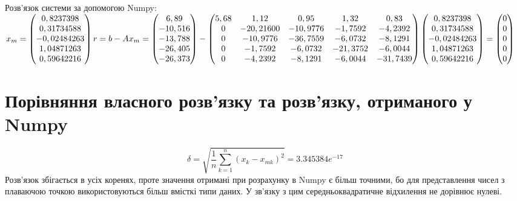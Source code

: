 \documentclass{report}
\begin{document}
Розв'язок системи за допомогою Numpy: $x_m = \begin{pmatrix}0,8237398\\0,31734588\\-0,02484263\\1,04871263\\0,59642216\end{pmatrix}\\
r = b - Ax_m =
\begin{pmatrix}
6,89\\
-10,516\\
-13,788\\
-26,405\\
-26,373
\end{pmatrix} - \begin{pmatrix}
5,68 & 1,12 & 0,95 & 1,32 & 0,83\\
0 & -20,21600 & -10,9776 & -1,7592 & -4,2392\\
0 & -10,9776 & -36,7559 & -6,0732 & -8,1291\\
0 & -1,7592 & -6,0732 & -21,3752 & -6,0044\\
0 & -4,2392 & -8,1291 & -6,0044 & -31,7439
\end{pmatrix}\begin{pmatrix}0,8237398\\0,31734588\\-0,02484263\\1,04871263\\0,59642216\end{pmatrix} = \begin{pmatrix}
0\\ 0\\ 0\\ 0\\0\\
\end{pmatrix}$

\section*{Порівняння власного розв’язку та розв’язку, отриманого у Numpy}
\[\delta=\sqrt{\frac{1}{n}\sum_{k=1}^{n} (x_k - x_{mk})^2} = 3.345384e^{-17}\] %
Розв'язок збігається в усіх коренях, проте значення отримані при розрахунку в Numpy є більш точними, бо для представлення чисел з плаваючою точкою використовуються більш вмісткі типи даних. У зв'язку з цим середньоквадратичне відхилення не дорівнює нулеві.
\end{document}
